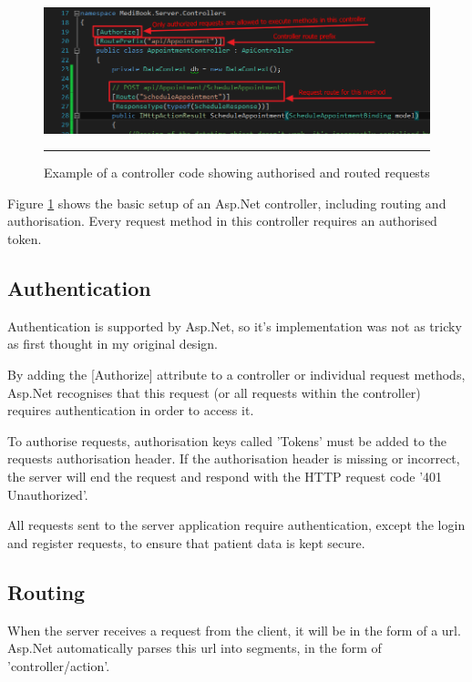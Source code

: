 \begin{figure}[htbp]
	\centering
		\includegraphics[width=\textwidth,height=\textheight,keepaspectratio]{Figures/ServerController.png}
		\rule{35em}{0.5pt}
		\caption[Example of a controller code showing authorised and routed requests]{Example of a controller code showing authorised and routed requests}
	\label{fig:servercontroller}
\end{figure}

Figure \ref{fig:servercontroller} shows the basic setup of an Asp.Net controller, including routing and authorisation. Every request method in this controller requires an authorised token.

\subsection{Authentication}

Authentication is supported by Asp.Net, so it's implementation was not as tricky as first thought in my original design.

By adding the [Authorize] attribute to a controller or individual request methods, Asp.Net recognises that this request (or all requests within the controller) requires authentication in order to access it.

To authorise requests, authorisation keys called 'Tokens' must be added to the requests authorisation header. If the authorisation header is missing or incorrect, the server will end the request and respond with the HTTP request code '401 Unauthorized'.

All requests sent to the server application require authentication, except the login and register requests, to ensure that patient data is kept secure.

\subsection{Routing}

When the server receives a request from the client, it will be in the form of a url. Asp.Net automatically parses this url into segments, in the form of '{controller}/{action}'.

